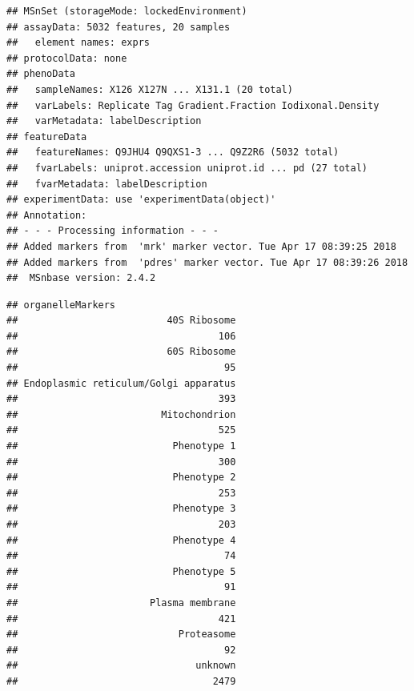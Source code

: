 \begin{knitrout}
\color{fgcolor}\begin{kframe}
\begin{alltt}
\end{alltt}
\begin{verbatim}
## MSnSet (storageMode: lockedEnvironment)
## assayData: 5032 features, 20 samples 
##   element names: exprs 
## protocolData: none
## phenoData
##   sampleNames: X126 X127N ... X131.1 (20 total)
##   varLabels: Replicate Tag Gradient.Fraction Iodixonal.Density
##   varMetadata: labelDescription
## featureData
##   featureNames: Q9JHU4 Q9QXS1-3 ... Q9Z2R6 (5032 total)
##   fvarLabels: uniprot.accession uniprot.id ... pd (27 total)
##   fvarMetadata: labelDescription
## experimentData: use 'experimentData(object)'
## Annotation:  
## - - - Processing information - - -
## Added markers from  'mrk' marker vector. Tue Apr 17 08:39:25 2018 
## Added markers from  'pdres' marker vector. Tue Apr 17 08:39:26 2018 
##  MSnbase version: 2.4.2
\end{verbatim}
\begin{alltt}
  \hlstd{=} \hlstd{)}
\end{alltt}
\begin{verbatim}
## organelleMarkers
##                          40S Ribosome 
##                                   106 
##                          60S Ribosome 
##                                    95 
## Endoplasmic reticulum/Golgi apparatus 
##                                   393 
##                         Mitochondrion 
##                                   525 
##                           Phenotype 1 
##                                   300 
##                           Phenotype 2 
##                                   253 
##                           Phenotype 3 
##                                   203 
##                           Phenotype 4 
##                                    74 
##                           Phenotype 5 
##                                    91 
##                       Plasma membrane 
##                                   421 
##                            Proteasome 
##                                    92 
##                               unknown 
##                                  2479
\end{verbatim}
\end{kframe}
\end{knitrout}

